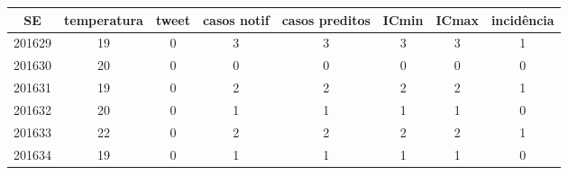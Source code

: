 \begin{tabular}{c|ccccccc}
  \hline
SE & temperatura & tweet & casos notif & casos preditos & ICmin & ICmax & incidência \\ 
  \hline
201629 & 19 & 0 & 3 & 3 & 3 & 3 & 1 \\ 
  201630 & 20 & 0 & 0 & 0 & 0 & 0 & 0 \\ 
  201631 & 19 & 0 & 2 & 2 & 2 & 2 & 1 \\ 
  201632 & 20 & 0 & 1 & 1 & 1 & 1 & 0 \\ 
  201633 & 22 & 0 & 2 & 2 & 2 & 2 & 1 \\ 
  201634 & 19 & 0 & 1 & 1 & 1 & 1 & 0 \\ 
   \hline
\end{tabular}
